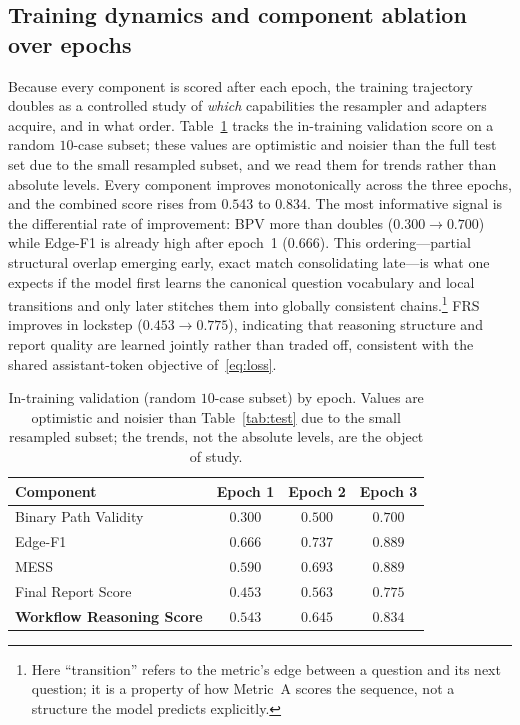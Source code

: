 \documentclass[11pt]{article}
\begin{document}
\subsection{Training dynamics and component ablation over epochs}
Because every component is scored after each epoch, the training trajectory
doubles as a controlled study of \emph{which} capabilities the resampler and
adapters acquire, and in what order. Table~\ref{tab:epochs} tracks the in-training
validation score on a random $10$-case subset; these values are optimistic and
noisier than the full test set due to the small resampled subset, and we read them
for trends rather than absolute levels. Every component improves monotonically
across the three epochs, and the combined score rises from $0.543$ to $0.834$.
The most informative signal is the differential rate of improvement: BPV more than
doubles ($0.300\!\to\!0.700$) while Edge-F1 is already high after epoch~1
($0.666$). This ordering---partial structural overlap emerging early, exact
match consolidating late---is what one expects if the model first learns the
canonical question vocabulary and local transitions and only later stitches them
into globally consistent chains.\footnote{Here ``transition'' refers to the
metric's edge between a question and its next question; it is a property of how
Metric~A scores the sequence, not a structure the model predicts explicitly.}
FRS improves in lockstep ($0.453\!\to\!0.775$),
indicating that reasoning structure and report quality are learned jointly rather
than traded off, consistent with the shared assistant-token objective
of~\eqref{eq:loss}.

\begin{table}[t]
\centering
\caption{In-training validation (random $10$-case subset) by epoch. Values are
optimistic and noisier than Table~\ref{tab:test} due to the small resampled
subset; the trends, not the absolute levels, are the object of study.}
\label{tab:epochs}
\begin{tabular}{lccc}
\toprule
\textbf{Component} & \textbf{Epoch 1} & \textbf{Epoch 2} & \textbf{Epoch 3}\\
\midrule
Binary Path Validity      & $0.300$ & $0.500$ & $0.700$\\
Edge-F1                   & $0.666$ & $0.737$ & $0.889$\\
MESS                      & $0.590$ & $0.693$ & $0.889$\\
Final Report Score        & $0.453$ & $0.563$ & $0.775$\\
\midrule
\textbf{Workflow Reasoning Score} & $0.543$ & $0.645$ & $\mathbf{0.834}$\\
\bottomrule
\end{tabular}
\end{table}
\end{document}
